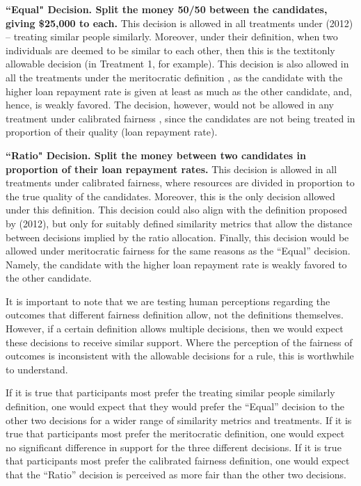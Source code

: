 \documentclass[letterpaper]{article} %
\begin{document}
 
 
 
 
\noindent
\textbf{``Equal" Decision. Split the money 50/50 between the candidates, giving \$25,000 to each.}
This decision is allowed in all treatments under \citeauthor{dwork2012fairness} (2012) -- treating similar people similarly. Moreover, under their definition, when two individuals are deemed to be similar to each other, then this is the textit{only} allowable decision (in Treatment 1, for example). This decision is also allowed in all the treatments under the meritocratic definition \cite{joseph2016fairness}, as the candidate with the higher loan repayment rate is given at least as much as the other candidate, and, hence, is weakly favored. The decision, however, would not be allowed in any treatment under calibrated fairness \cite{liu2017calibrated}, since the candidates are not being treated in proportion of their quality (loan repayment rate).




\noindent
\textbf{``Ratio" Decision. Split the money between two candidates in proportion of their loan repayment rates.} 
This decision is allowed in all treatments under calibrated fairness, where resources are divided in proportion to the true quality of the candidates. Moreover, this is the only decision allowed under this definition. This decision could also align with the definition proposed by \citeauthor{dwork2012fairness} (2012), but only for suitably defined similarity metrics that allow the distance between decisions implied by the ratio allocation. Finally, this decision would be allowed under meritocratic fairness \cite{joseph2016fairness} for the same reasons as the ``Equal'' decision. Namely, the candidate with the higher loan repayment rate is weakly favored to the other candidate. 

It is important to note that we are testing  human perceptions regarding the outcomes that different fairness definition allow, not the definitions themselves. However, if a certain definition allows multiple decisions, then we would expect these decisions to receive similar support. Where the perception of the fairness of outcomes is inconsistent with the allowable decisions for a rule, this is worthwhile to understand.  

If it is true that participants most prefer the treating similar people similarly definition, one would expect that they would prefer the ``Equal'' decision to the other two decisions for a wider range of similarity metrics and treatments. If it is true that participants most prefer the meritocratic definition, one would expect no significant difference in support for the three different decisions. If it is true that participants most prefer the calibrated fairness definition, one would expect that the ``Ratio'' decision is perceived as more fair than the other two decisions. 
\end{document}
